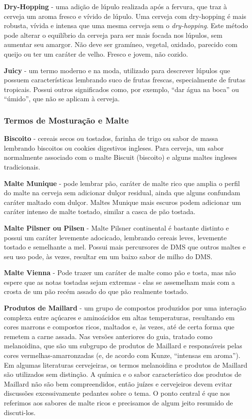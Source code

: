 \textbf{Dry-Hopping} - uma adição de lúpulo realizada após a fervura, que traz à cerveja um aroma fresco e vívido de lúpulo. Uma cerveja com dry-hopping é mais robusta, vívida e intensa que uma mesma cerveja sem o \textit{dry-hopping}. Este método pode alterar o equilíbrio da cerveja para ser mais focada nos lúpulos, sem aumentar seu amargor. Não deve ser gramíneo, vegetal, oxidado, parecido com queijo ou ter um caráter de velho. Fresco e jovem, não cozido.

\textbf{Juicy} - um termo moderno e na moda, utilizado para descrever lúpulos que possuem características lembrando suco de frutas frescas, especialmente de frutas tropicais. Possui outros significados como, por exemplo, “dar água na boca” ou “úmido”, que não se aplicam à cerveja.

\subsubsection*{Termos de Mosturação e Malte}
\textbf{Biscoito} - cereais secos ou tostados, farinha de trigo ou sabor de massa lembrando biscoitos ou cookies digestivos ingleses. Para cerveja, um sabor normalmente associado com o malte Biscuit (biscoito) e alguns maltes ingleses tradicionais.

\textbf{Malte Munique} - pode lembrar pão, caráter de malte rico que amplia o perfil do malte na cerveja sem adicionar dulçor residual, ainda que alguns confundam caráter maltado com dulçor. Maltes Munique mais escuros podem adicionar um caráter intenso de malte tostado, similar a casca de pão tostada.

\textbf{Malte Pilsner ou Pilsen} - Malte Pilsner continental é bastante distinto e possui um caráter levemente adocicado, lembrando cereais leves, levemente tostado e semelhante a mel. Possui mais percursores de DMS que outros maltes e seu uso pode, às vezes, resultar em um baixo sabor de milho do DMS.

\textbf{Malte Vienna} - Pode trazer um caráter de malte como pão e tosta, mas não espere que as notas tostadas sejam extremas - elas se assemelham mais com a crosta de um pão recém assado do que pão realmente tostado.

\textbf{Produtos de Maillard} - um grupo de compostos produzidos por uma interação complexa entre açúcares e aminoácidos em altas temperaturas, resultando em cores marrons e compostos ricos, maltados e, às vezes, até de certa forma que remetem a carne assada. Nas versões anteriores do guia, tratado como melanoidina, que são um subgrupo de produtos de Maillard e responsáveis pelas cores vermelhas-amarronzadas (e, de acordo com Kunze, “intensas em aroma”). Em algumas literaturas cervejeiras, os termos melanoidina e produtos de Maillard são utilizados sem distinção. A química e o sabor característico dos produtos de Maillard não são bem compreendidos, então juízes e cervejeiros devem evitar discussões excessivamente pedantes sobre o tema. O ponto central é que nos referimos aos sabores de malte ricos e precisamos de algum jeito resumido de discuti-los.

